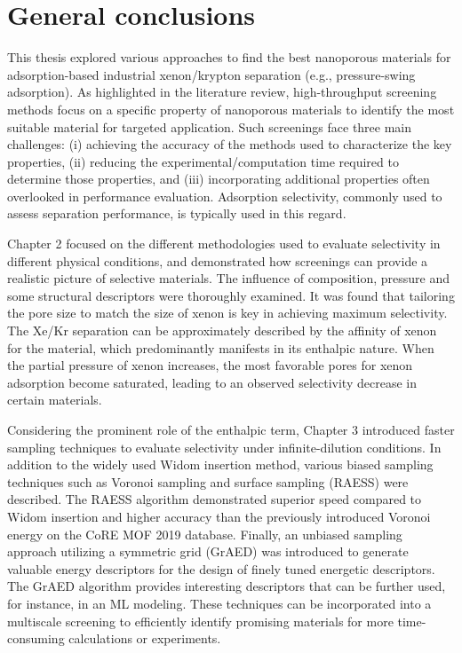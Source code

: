 
\chapter*{General conclusions}

This thesis explored various approaches to find the best nanoporous materials for adsorption-based industrial xenon/krypton separation (e.g., pressure-swing adsorption). As highlighted in the literature review,\autocite{Ren_2022} high-throughput screening methods focus on a specific property of nanoporous materials to identify the most suitable material for targeted application. Such screenings face three main challenges: (i) achieving the accuracy of the methods used to characterize the key properties, (ii) reducing the experimental/computation time required to determine those properties, and (iii) incorporating additional properties often overlooked in performance evaluation. Adsorption selectivity, commonly used to assess separation performance, is typically used in this regard.

Chapter 2 focused on the different methodologies used to evaluate selectivity in different physical conditions, and demonstrated how screenings can provide a realistic picture of selective materials.\autocite{Ren_2021} The influence of composition, pressure and some structural descriptors were thoroughly examined. It was found that tailoring the pore size to match the size of xenon is key in achieving maximum selectivity. The Xe/Kr separation can be approximately described by the affinity of xenon for the material, which predominantly manifests in its enthalpic nature. When the partial pressure of xenon increases, the most favorable pores for xenon adsorption become saturated, leading to an observed selectivity decrease in certain materials.
 
Considering the prominent role of the enthalpic term, Chapter 3 introduced faster sampling techniques to evaluate selectivity under infinite-dilution conditions. In addition to the widely used Widom insertion method, various biased sampling techniques such as Voronoi sampling and surface sampling (RAESS) were described. The RAESS algorithm\autocite{Ren_2023} demonstrated superior speed compared to Widom insertion and higher accuracy than the previously introduced Voronoi energy\autocite{Simon_2015} on the CoRE MOF 2019 database. Finally, an unbiased sampling approach utilizing a symmetric grid (GrAED) was introduced to generate valuable energy descriptors for the design of finely tuned energetic descriptors. The GrAED algorithm provides interesting descriptors that can be further used, for instance, in an ML modeling. These techniques can be incorporated into a multiscale screening to efficiently identify promising materials for more time-consuming calculations or experiments.

